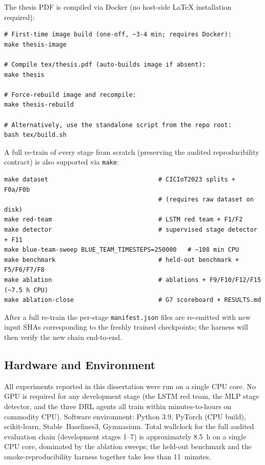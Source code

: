 The thesis PDF is compiled via Docker (no host-side \LaTeX{} installation required):

\begin{verbatim}
# First-time image build (one-off, ~3-4 min; requires Docker):
make thesis-image

# Compile tex/thesis.pdf (auto-builds image if absent):
make thesis

# Force-rebuild image and recompile:
make thesis-rebuild

# Alternatively, use the standalone script from the repo root:
bash tex/build.sh
\end{verbatim}

A full re-train of every stage from scratch (preserving the audited reproducibility contract) is also supported via \texttt{make}:

\begin{verbatim}
make dataset                              # CICIoT2023 splits + F0a/F0b
                                          # (requires raw dataset on disk)
make red-team                             # LSTM red team + F1/F2
make detector                             # supervised stage detector + F11
make blue-team-sweep BLUE_TEAM_TIMESTEPS=250000   # ~108 min CPU
make benchmark                            # held-out benchmark + F5/F6/F7/F8
make ablation                             # ablations + F9/F10/F12/F15 (~7.5 h CPU)
make ablation-close                       # G7 scoreboard + RESULTS.md
\end{verbatim}

After a full re-train the per-stage \texttt{manifest.json} files are re-emitted with new input SHAs corresponding to the freshly trained checkpoints; the harness will then verify the new chain end-to-end.

\subsection{Hardware and Environment}\label{app:hardware}
All experiments reported in this dissertation were run on a single CPU core. No GPU is required for any development stage (the LSTM red team, the MLP stage detector, and the three DRL agents all train within minutes-to-hours on commodity CPU). Software environment: Python 3.9, PyTorch (CPU build), scikit-learn, Stable~Baselines3, Gymnasium. Total wallclock for the full audited evaluation chain (development stages 1--7) is approximately 8.5~h on a single CPU core, dominated by the ablation sweeps; the held-out benchmark and the smoke-reproducibility harness together take less than 11~minutes.

